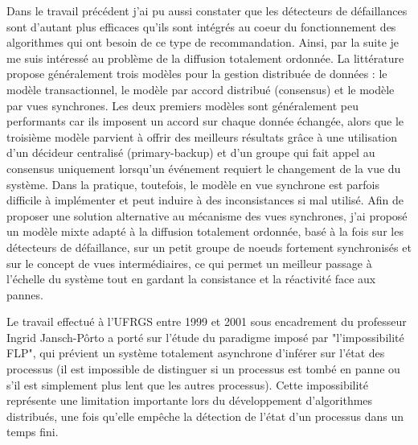 \documentclass[a4paper]{book}
\begin{document}
Dans le travail précédent j'ai pu aussi constater que les détecteurs de défaillances sont d'autant plus efficaces qu'ils sont intégrés au coeur du fonctionnement des algorithmes qui ont besoin de ce type de recommandation. Ainsi, par la suite je me suis intéressé au problème de la diffusion totalement ordonnée. La littérature propose généralement trois modèles pour la gestion distribuée de données : le modèle transactionnel, le modèle par accord distribué (consensus) et le modèle par vues synchrones. Les deux premiers modèles sont généralement peu performants car ils imposent un accord sur chaque donnée échangée, alors que le troisième modèle parvient à offrir des meilleurs résultats grâce à une utilisation d'un décideur centralisé (primary-backup) et d'un groupe qui fait appel au consensus uniquement lorsqu'un événement requiert le changement de la vue du système. Dans la pratique, toutefois, le modèle en vue synchrone est parfois difficile à implémenter et peut induire à des inconsistances si mal utilisé. Afin de proposer une solution alternative au mécanisme des vues synchrones, j'ai proposé un modèle mixte adapté à la diffusion totalement ordonnée, basé à la fois sur les détecteurs de défaillance, sur un petit groupe de noeuds fortement synchronisés et sur le concept de vues intermédiaires, ce qui permet un meilleur passage à l'échelle du système tout en gardant la consistance et la réactivité face aux pannes.      


Le travail effectué à l'UFRGS entre 1999 et 2001 sous encadrement du professeur Ingrid Jansch-Pôrto a porté sur l'étude du paradigme imposé par "l'impossibilité FLP", qui prévient un système totalement asynchrone d'inférer sur l'état des processus (il est impossible de distinguer si un processus est tombé en panne ou s'il est simplement plus lent que les autres processus). Cette impossibilité représente une limitation importante lors du développement d'algorithmes distribués, une fois qu'elle empêche la détection de l'état d'un processus dans un temps fini.
\end{document}
